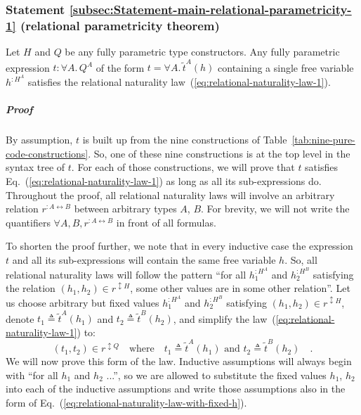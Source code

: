\subsubsection{Statement \label{subsec:Statement-main-relational-parametricity-1}\ref{subsec:Statement-main-relational-parametricity-1}
(relational parametricity theorem)}

Let $H$ and $Q$ be any fully parametric type constructors. Any fully
parametric expression $t:\forall A.\,Q^{A}$ of the form $t=\forall A.\,\tilde{t}^{A}(h)$
containing a single free variable $h^{:H^{A}}$ satisfies the relational
naturality law~(\ref{eq:relational-naturality-law-1}).

\subparagraph{Proof }

By assumption, $t$ is built up from the nine constructions of Table~\ref{tab:nine-pure-code-constructions}.
So, one of these nine constructions is at the top level in the syntax
tree of $t$. For each of those constructions, we will prove that
$t$ satisfies Eq.~(\ref{eq:relational-naturality-law-1}) as long
as all its sub-expressions do. Throughout the proof, all relational
naturality laws will involve an arbitrary relation $r^{:A\leftrightarrow B}$
between arbitrary types $A$, $B$. For brevity, we will not write
the quantifiers $\forall A,B,r^{:A\leftrightarrow B}$ in front of
all formulas.

To shorten the proof further, we note that in every inductive case
the expression $t$ and all its sub-expressions will contain the same
free variable $h$. So, all relational naturality laws will follow
the pattern \textsf{``}for all $h_{1}^{:H^{A}}$ and $h_{2}^{:H^{B}}$ satisfying
the relation $(h_{1},h_{2})\in r^{\updownarrow H}$, some other values
are in some other relation\textsf{''}. Let us choose arbitrary but fixed values
$h_{1}^{:H^{A}}$ and $h_{2}^{:H^{B}}$ satisfying $(h_{1},h_{2})\in r^{\updownarrow H}$,
denote $t_{1}\triangleq\tilde{t}^{A}(h_{1})$ and $t_{2}\triangleq\tilde{t}^{B}(h_{2})$,
and simplify the law~(\ref{eq:relational-naturality-law-1}) to:
\begin{equation}
(t_{1},t_{2})\in r^{\updownarrow Q}\quad\text{where}\quad t_{1}\triangleq\tilde{t}^{A}(h_{1})\text{ and }t_{2}\triangleq\tilde{t}^{B}(h_{2})\quad.\label{eq:relational-naturality-law-with-fixed-h}
\end{equation}
We will now prove this form of the law. Inductive assumptions will
always begin with \textsf{``}for all $h_{1}$ and $h_{2}$ ...\textsf{''}, so we are
allowed to substitute the fixed values $h_{1}$, $h_{2}$ into each
of the inductive assumptions and write those assumptions also in the
form of Eq.~(\ref{eq:relational-naturality-law-with-fixed-h}).

